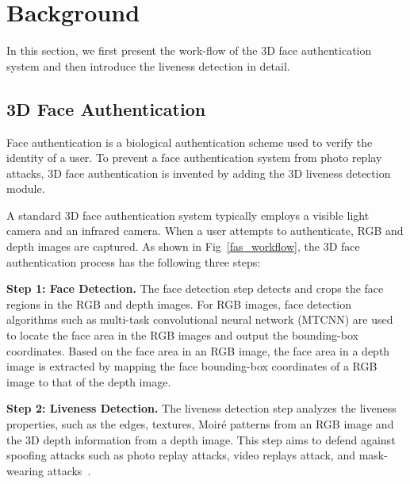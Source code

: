 \section{Background}
\label{sec:background}
In this section, we first present the work-flow of the 3D face authentication system and then introduce the liveness detection in detail.

\subsection{3D Face Authentication}
Face authentication is a biological authentication scheme used to verify the identity of a user. To prevent a face authentication system from photo replay attacks, 3D face authentication is invented by adding the 3D liveness detection module. 

A standard 3D face authentication system typically employs a visible light camera and an infrared camera. When a user attempts to authenticate, RGB and depth images are captured. As shown in Fig~\ref{fas_workflow}, the 3D face authentication process has the following three steps:

\textbf{Step 1: Face Detection.} 
The face detection step detects and crops the face regions in the RGB and depth images. For RGB images, face detection algorithms such as multi-task convolutional neural network (MTCNN) \cite{zhang2016joint} are used to locate the face area in the RGB images and output the bounding-box coordinates. Based on the face area in an RGB image, the face area in a depth image is extracted by mapping the face bounding-box coordinates of a RGB image to that of the depth image.

\textbf{Step 2: Liveness Detection.} The liveness detection step analyzes the liveness properties, such as the edges, textures, Moiré patterns
 from an RGB image and the 3D depth information from a depth image. 
This step aims to defend against spoofing attacks such as photo replay attacks, video replays attack, and mask-wearing attacks~\cite{chakka2011competition,anjos2011counter,raghavendra2015presentation, bhattacharjee2018spoofing, nesli2013spoofing}.

